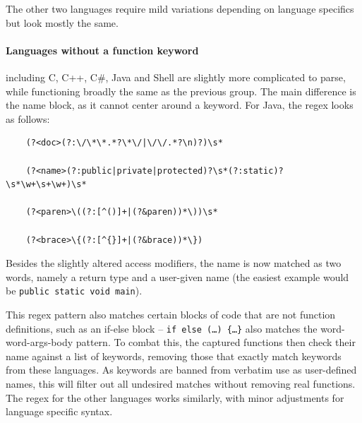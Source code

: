 The other two languages require mild variations depending on language specifics but look mostly the same.

\paragraph{Languages without a function keyword} including C, C++, C\#, Java and Shell are slightly more complicated to parse, while functioning broadly the same as the previous group.
The main difference is the name block, as it cannot center around a keyword.
For Java, the \ac{regex} looks as follows:

\begin{verbatim}
    (?<doc>(?:\/\*\*.*?\*\/|\/\/.*?\n)?)\s*
    
    (?<name>(?:public|private|protected)?\s*(?:static)?\s*\w+\s+\w+)\s*
    
    (?<paren>\((?:[^()]+|(?&paren))*\))\s*
    
    (?<brace>\{(?:[^{}]+|(?&brace))*\})
\end{verbatim}

Besides the slightly altered access modifiers, the name is now matched as two words, namely a return type and a user-given name (the easiest example would be \texttt{public static void main}).

This \ac{regex} pattern also matches certain blocks of code that are not function definitions, such as an if-else block -- \texttt{if else (\dots) \{\dots\}} also matches the word-word-args-body pattern.
To combat this, the captured functions then check their name against a list of keywords, removing those that exactly match keywords from these languages.
As keywords are banned from verbatim use as user-defined names, this will filter out all undesired matches without removing real functions.
The regex for the other languages works similarly, with minor adjustments for language specific syntax.

